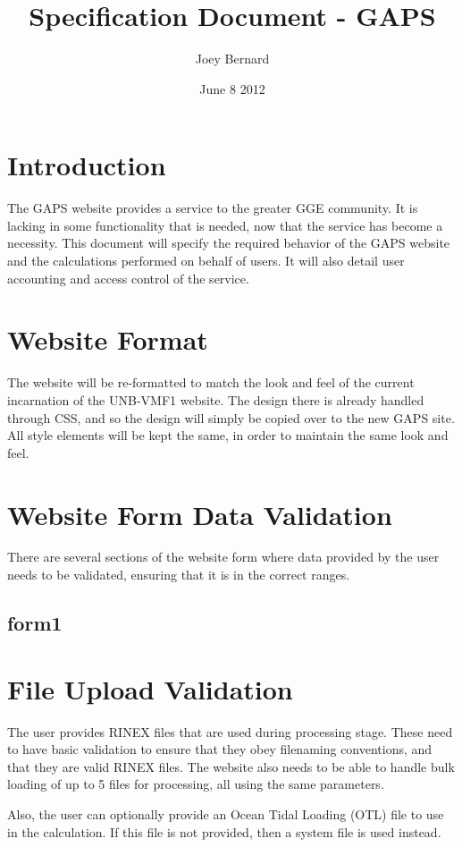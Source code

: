 \documentclass{report}
\begin{document}
\title{Specification Document - GAPS}
\author{Joey Bernard}
\date{June 8 2012}
\maketitle

\tableofcontents


\chapter{Introduction}
\par The GAPS website provides a service to the greater GGE community. It is lacking in some functionality that is needed, now that the service has become a necessity. This document will specify the required behavior of the GAPS website and the calculations performed on behalf of users. It will also detail user accounting and access control of the service.


\chapter{Website Format}
\par The website will be re-formatted to match the look and feel of the current incarnation of the UNB-VMF1 website. The design there is already handled through CSS, and so the design will simply be copied over to the new GAPS site. All style elements will be kept the same, in order to maintain the same look and feel.


\chapter{Website Form Data Validation}
\par There are several sections of the website form where data provided by the user needs to be validated, ensuring that it is in the correct ranges.
\section{form1}


\chapter{File Upload Validation}
\par The user provides RINEX files that are used during processing stage. These need to have basic validation to ensure that they obey filenaming conventions, and that they are valid RINEX files. The website also needs to be able to handle bulk loading of up to 5 files for processing, all using the same parameters.
\par Also, the user can optionally provide an Ocean Tidal Loading (OTL) file to use in the calculation. If this file is not provided, then a system file is used instead.
\end{document}
